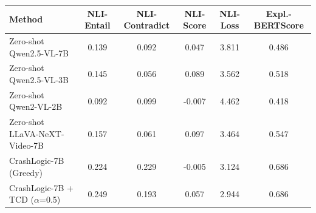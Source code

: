 \begin{tabular}{lccccc}
\toprule
Method & NLI-Entail & NLI-Contradict & NLI-Score & NLI-Loss & Expl.-BERTScore \\
\midrule
Zero-shot Qwen2.5-VL-7B & 0.139 & 0.092 & 0.047 & 3.811 & 0.486 \\
Zero-shot Qwen2.5-VL-3B & 0.145 & 0.056 & 0.089 & 3.562 & 0.518 \\
Zero-shot Qwen2-VL-2B & 0.092 & 0.099 & -0.007 & 4.462 & 0.418 \\
Zero-shot LLaVA-NeXT-Video-7B & 0.157 & 0.061 & 0.097 & 3.464 & 0.547 \\
CrashLogic-7B (Greedy) & 0.224 & 0.229 & -0.005 & 3.124 & 0.686 \\
CrashLogic-7B + TCD ($\alpha$=0.5) & 0.249 & 0.193 & 0.057 & 2.944 & 0.686 \\
\bottomrule
\end{tabular}
